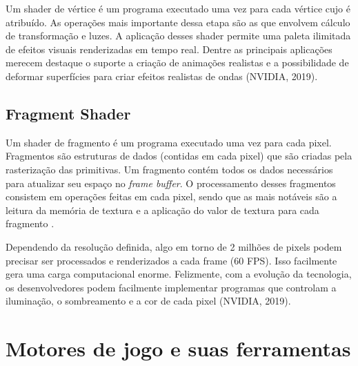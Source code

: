 Um shader de vértice é um programa executado uma vez para cada vértice cujo é atribuído. As operações mais importante dessa etapa são as que envolvem cálculo de transformação e luzes. A aplicação desses shader permite uma paleta ilimitada de efeitos visuais renderizadas em tempo real. Dentre as principais aplicações merecem destaque o suporte a criação de animações realistas e a possibilidade de deformar superfícies para criar efeitos realistas de ondas (NVIDIA, 2019)\nocite{vertexShader}.

	\begin{figure}[h!]
		\centering
	\end{figure}
	\nocite{shaderStages}


\subsection{Fragment Shader}
\label{sec:fragment-shader}

Um shader de fragmento é um programa executado uma vez para cada pixel. Fragmentos são estruturas de dados (contidas em cada pixel) que são criadas pela rasterização das primitivas. Um fragmento contém todos os dados necessários para atualizar seu espaço no \textit{frame buffer}. O processamento desses fragmentos consistem em operações feitas em cada pixel, sendo que as mais notáveis são a leitura da memória de textura e a aplicação do valor de textura para cada fragmento \cite{GLSLBook}. 

Dependendo da resolução definida, algo em torno de 2 milhões de pixels podem precisar ser processados e renderizados a cada frame (60 FPS). Isso facilmente gera uma carga computacional enorme. Felizmente, com a evolução da tecnologia, os desenvolvedores podem facilmente implementar programas que controlam a iluminação, o sombreamento e a cor de cada pixel (NVIDIA, 2019)\nocite{fragShader}.

\section{Motores de jogo e suas ferramentas}
\label{sec:motores-jogo-ferramentas}

